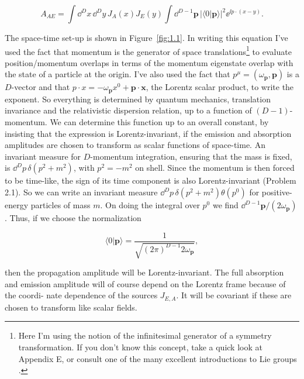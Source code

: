 \begin{equation}
  A_{AE}=\int\dd^D x\,\dd^D y\,J_A(x)J_E(y)\int\dd^{D-1}\mathbf p\,|\langle0|\mathbf p\rangle|^2\ee^{\ii p\mathbin{\cdot}(x-y)}.
  \label{eq:1.2}
\end{equation}

The space-time set-up is shown in Figure~\ref{fig:1.1}. In writing this equation I've used the fact
that momentum is the generator of space translations\footnote[2]{Here I'm using the notion of the infinitesimal generator of a symmetry transformation. If you don't know this concept, take a quick look at Appendix E, or consult one of the many excellent introductions to Lie groups \cite{banks-ref-1,banks-ref-2,banks-ref-3,banks-ref-4}.} to evaluate position/momentum overlaps in terms of the momentum eigenstate overlap with the state of a particle at
the origin. I've also used the fact that $p^\mu=(\omega_{\mathbf p},\mathbf p)$ is a $D$-vector and that
$p\mathbin{\cdot}x=-\omega_{\mathbf p}x^0+\mathbf p\mathbin{\cdot}\mathbf x$, the Lorentz scalar product, to write the exponent.
So everything is determined by quantum mechanics, translation
invariance and the relativistic dispersion relation, up to a function of $(D-1)$-momentum. We
can determine this function up to an overall constant, by insisting that the expression is
Lorentz-invariant, if the emission and absorption amplitudes are chosen to transform
as scalar functions of space-time. An invariant measure for $D$-momentum integration,
ensuring that the mass is fixed, is $\dd^D p\,\delta(p^2+m^2)$, with $p^2=-m^2$ on shell. Since the momentum is then forced
to be time-like, the sign of its time component is also Lorentz-invariant (Problem 2.1).
So we can write an invariant measure $\dd^D p\,\delta(p^2+m^2)\theta(p^0)$ for positive-energy particles
of mass $m$. On doing the integral over $p^0$ we find $\dd^{D-1}\mathbf p/(2\omega_{\mathbf p})$. Thus, if we choose the
normalization

\begin{equation}
  \langle0|\mathbf p\rangle=\frac{1}{\sqrt{(2\pi)^{D-1} 2\omega_{\mathbf p}}},
  \label{eq:1.3}
\end{equation}

then the propagation amplitude will be Lorentz-invariant. The full absorption and
emission amplitude will of course depend on the Lorentz frame because of the coordi-
nate dependence of the sources $J_{E,A}$. It will be covariant if these are chosen to transform
like scalar fields.

